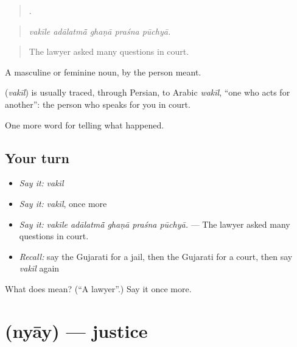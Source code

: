 \begin{quote}
    .
\end{quote}

\begin{quote}
\emph{vakīle adālatmā̃ ghaṇā praśna pūchyā.}
\end{quote}

\begin{quote}
The lawyer asked many questions in court.
\end{quote}

A masculine or feminine noun, by the person meant.

\begin{cousinweb}
\textbf{} (\emph{vakīl}) is usually traced, through Persian, to Arabic \emph{wakīl}, \textquotedblleft{}one who acts for another\textquotedblright{}: the person who speaks for you in court.
\end{cousinweb}

\begin{grammarlens}[title={What you've built}]
One more word for telling what happened.
\end{grammarlens}

\subsection*{Your turn}
\begin{itemize}
\raggedright
  \item \emph{Say it:} \emph{vakīl}
  \item \emph{Say it:} \emph{vakīl}, once more
  \item \emph{Say it:} \emph{vakīle adālatmā̃ ghaṇā praśna pūchyā.} — The lawyer asked many questions in court.
  \item \emph{Recall:} say the Gujarati for a jail, then the Gujarati for a court, then say \emph{vakīl} again
\end{itemize}

\begin{tcolorbox}[breakable,colback=teal!4,colframe=teal!35!black,title={Before you move on}]
What does  mean? (\textquotedblleft{}A lawyer\textquotedblright{}.) Say it once more.
\end{tcolorbox}
\section[\texorpdfstring{\gu{ન્યાય} (nyāy)}{ન્યાય (nyāy)}]{ (nyāy) — justice}

